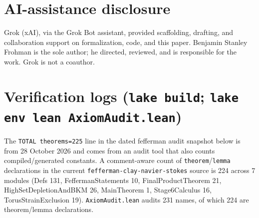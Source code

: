 \documentclass[11pt]{article}
\begin{document}
\section{AI-assistance disclosure}
Grok (xAI), via the Grok Bot assistant, provided scaffolding, drafting, and collaboration support on formalization, code, and this paper. Benjamin Stanley Frohman is the sole author; he directed, reviewed, and is responsible for the work. Grok is not a coauthor.
\appendix\section{Verification logs (\texttt{lake build}; \texttt{lake env lean AxiomAudit.lean})}
The \texttt{TOTAL theorems=225} line in the dated fefferman audit snapshot below is from 28 October 2026 and comes from an audit tool that also counts compiled/generated constants. A comment-aware count of \texttt{theorem}/\texttt{lemma} declarations in the current \texttt{fefferman-clay-navier-stokes} source is 224 across 7 modules (Defs 131, FeffermanStatements 10, FinalProductTheorem 21, HighSetDepletionAndBKM 26, MainTheorem 1, Stage6Calculus 16, TorusStrainExclusion 19). \texttt{AxiomAudit.lean} audits 231 names, of which 224 are theorem/lemma declarations.
\end{document}
